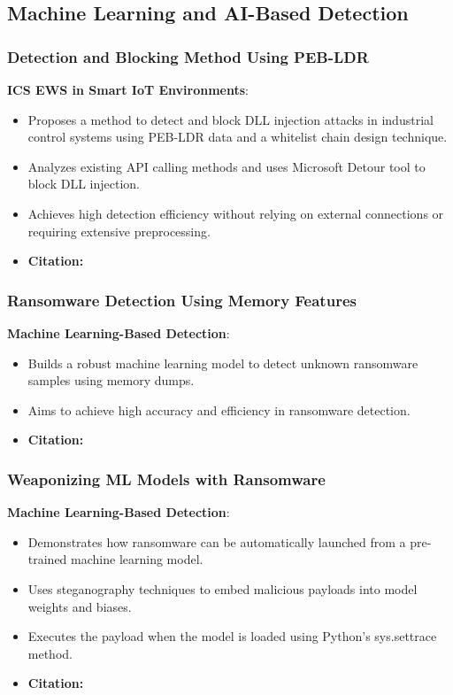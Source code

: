 \subsection{Machine Learning and AI-Based Detection}
\begin{frame}
    \frametitle{Detection and Blocking Method Using PEB-LDR}
    \textbf{ICS EWS in Smart IoT Environments}:
    \begin{itemize}
        \item Proposes a method to detect and block DLL injection attacks in industrial control systems using PEB-LDR data and a whitelist chain design technique.
        \item Analyzes existing API calling methods and uses Microsoft Detour tool to block DLL injection.
        \item Achieves high detection efficiency without relying on external connections or requiring extensive preprocessing.
        \item \textbf{Citation:} \cite{kim2023}
    \end{itemize}
\end{frame}

\begin{frame}
    \frametitle{Ransomware Detection Using Memory Features}
    \textbf{Machine Learning-Based Detection}:
    \begin{itemize}
        \item Builds a robust machine learning model to detect unknown ransomware samples using memory dumps.
        \item Aims to achieve high accuracy and efficiency in ransomware detection.
        \item \textbf{Citation:} \cite{aljabri2024}
    \end{itemize}
\end{frame}

\begin{frame}
    \frametitle{Weaponizing ML Models with Ransomware}
    \textbf{Machine Learning-Based Detection}:
    \begin{itemize}
        \item Demonstrates how ransomware can be automatically launched from a pre-trained machine learning model.
        \item Uses steganography techniques to embed malicious payloads into model weights and biases.
        \item Executes the payload when the model is loaded using Python's sys.settrace method.
        \item \textbf{Citation:} \cite{wickens2022}
    \end{itemize}
\end{frame}

